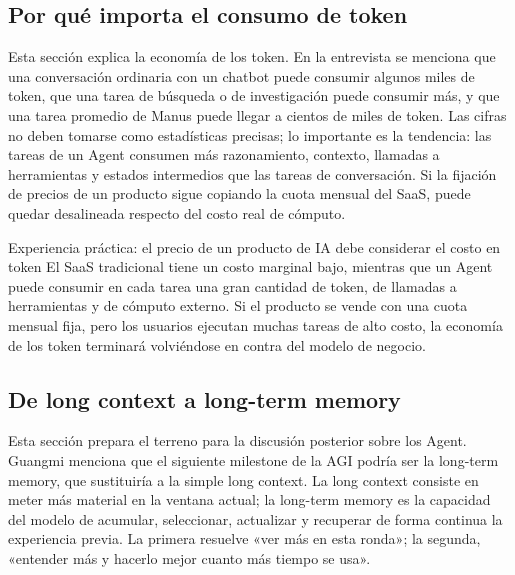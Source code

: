 \documentclass[a4paper]{article}
\begin{document}
\subsection{Por qué importa el consumo de token}

Esta sección explica la economía de los token. En la entrevista se menciona que una conversación ordinaria con un chatbot puede consumir algunos miles de token, que una tarea de búsqueda o de investigación puede consumir más, y que una tarea promedio de Manus puede llegar a cientos de miles de token. Las cifras no deben tomarse como estadísticas precisas; lo importante es la tendencia: las tareas de un Agent consumen más razonamiento, contexto, llamadas a herramientas y estados intermedios que las tareas de conversación. Si la fijación de precios de un producto sigue copiando la cuota mensual del SaaS, puede quedar desalineada respecto del costo real de cómputo.

\begin{importantbox}{Experiencia práctica: el precio de un producto de IA debe considerar el costo en token}
El SaaS tradicional tiene un costo marginal bajo, mientras que un Agent puede consumir en cada tarea una gran cantidad de token, de llamadas a herramientas y de cómputo externo. Si el producto se vende con una cuota mensual fija, pero los usuarios ejecutan muchas tareas de alto costo, la economía de los token terminará volviéndose en contra del modelo de negocio.
\end{importantbox}

\subsection{De long context a long-term memory}

Esta sección prepara el terreno para la discusión posterior sobre los Agent. Guangmi menciona que el siguiente milestone de la AGI podría ser la long-term memory, que sustituiría a la simple long context. La long context consiste en meter más material en la ventana actual; la long-term memory es la capacidad del modelo de acumular, seleccionar, actualizar y recuperar de forma continua la experiencia previa. La primera resuelve «ver más en esta ronda»; la segunda, «entender más y hacerlo mejor cuanto más tiempo se usa».
\end{document}

